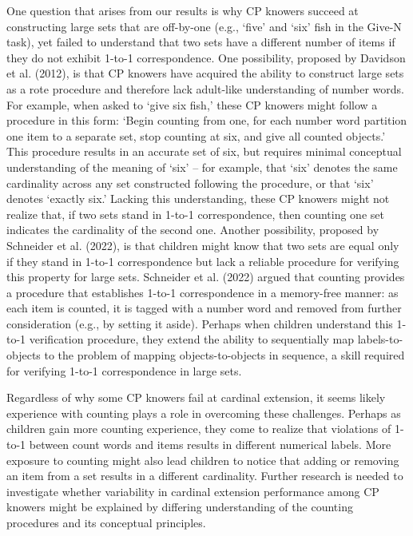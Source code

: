\documentclass[10pt, letterpaper]{article}
\begin{document}
One question that arises from our results is why CP knowers succeed at
constructing large sets that are off-by-one (e.g., `five' and `six' fish
in the Give-N task), yet failed to understand that two sets have a
different number of items if they do not exhibit 1-to-1 correspondence.
One possibility, proposed by Davidson et al. (2012), is that CP knowers
have acquired the ability to construct large sets as a rote procedure
and therefore lack adult-like understanding of number words. For
example, when asked to `give six fish,' these CP knowers might follow a
procedure in this form: `Begin counting from one, for each number word
partition one item to a separate set, stop counting at six, and give all
counted objects.' This procedure results in an accurate set of six, but
requires minimal conceptual understanding of the meaning of `six' -- for
example, that `six' denotes the same cardinality across any set
constructed following the procedure, or that `six' denotes `exactly
six.' Lacking this understanding, these CP knowers might not realize
that, if two sets stand in 1-to-1 correspondence, then counting one set
indicates the cardinality of the second one. Another possibility,
proposed by Schneider et al. (2022), is that children might know that
two sets are equal only if they stand in 1-to-1 correspondence but lack
a reliable procedure for verifying this property for large sets.
Schneider et al. (2022) argued that counting provides a procedure that
establishes 1-to-1 correspondence in a memory-free manner: as each item
is counted, it is tagged with a number word and removed from further
consideration (e.g., by setting it aside). Perhaps when children
understand this 1-to-1 verification procedure, they extend the ability
to sequentially map labels-to-objects to the problem of mapping
objects-to-objects in sequence, a skill required for verifying 1-to-1
correspondence in large sets.

Regardless of why some CP knowers fail at cardinal extension, it seems
likely experience with counting plays a role in overcoming these
challenges. Perhaps as children gain more counting experience, they come
to realize that violations of 1-to-1 between count words and items
results in different numerical labels. More exposure to counting might
also lead children to notice that adding or removing an item from a set
results in a different cardinality. Further research is needed to
investigate whether variability in cardinal extension performance among
CP knowers might be explained by differing understanding of the counting
procedures and its conceptual principles.
\end{document}
